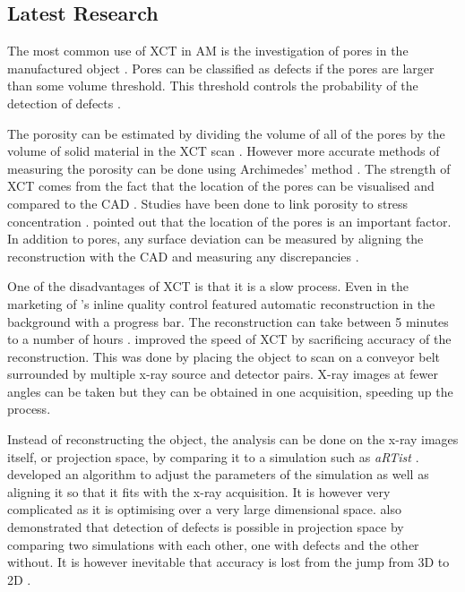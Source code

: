 \subsection{Latest Research}

The most common use of XCT in AM is the investigation of pores in the manufactured object \citep{thompson2016x}. Pores can be classified as defects if the pores are larger than some volume threshold. This threshold controls the probability of the detection of defects \citep{gandossi2010probability, amrhein2014characterization}.

The porosity can be estimated by dividing the volume of all of the pores by the volume of solid material in the XCT scan \citep{taud2005porosity}. However more accurate methods of measuring the porosity can be done using Archimedes' method \citep{spierings2011comparison}. The strength of XCT comes from the fact that the location of the pores can be visualised and compared to the CAD \citep{lee2015compliance, villarraga2015assessing, kim2016inspection}. Studies have been done to link porosity to stress concentration \citep{leuders2015fatigue, siddique2015computed, carlton2016damage}. \cite{leuders2015fatigue} pointed out that the location of the pores is an important factor. In addition to pores, any surface deviation can be measured by aligning the reconstruction with the CAD and measuring any discrepancies \citep{lee2015compliance, villarraga2015assessing, kim2016inspection}.

One of the disadvantages of XCT is that it is a slow process. Even in the marketing of \cite{nikon2015inline}'s inline quality control featured automatic reconstruction in the background with a progress bar. The reconstruction can take between 5 minutes to a number of hours \citep{warnett2016towards}. \cite{warnett2016towards} improved the speed of XCT by sacrificing accuracy of the reconstruction. This was done by placing the object to scan on a conveyor belt surrounded by multiple x-ray source and detector pairs. X-ray images at fewer angles can be taken but they can be obtained in one acquisition, speeding up the process.

Instead of reconstructing the object, the analysis can be done on the x-ray images itself, or projection space, by comparing it to a simulation such as \emph{aRTist} \citep{bellon2007artist, jaenisch2008artist, bellon2012radiographic}. \cite{brierley2018optimized} developed an algorithm to adjust the parameters of the simulation as well as aligning it so that it fits with the x-ray acquisition. It is however very complicated as it is optimising over a very large dimensional space. \cite{brierley2018optimized} also demonstrated that detection of defects is possible in projection space by comparing two simulations with each other, one with defects and the other without. It is however inevitable that accuracy is lost from the jump from 3D to 2D \citep{hayden2009chest}.